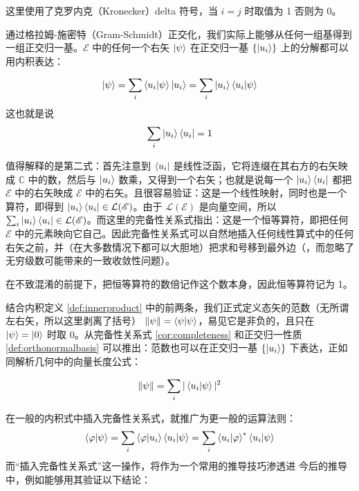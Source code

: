 \documentclass[cn,10pt,math=newtx,citestyle=gb7714-2015,bibstyle=gb7714-2015]{elegantbook}
\def\ms{\mathscr}
\def\mc{\mathcal}
\def\mr{\mathrm}
\def\C{\mathbb C}
\def\vphi{\varphi}
\begin{document}
这里使用了克罗内克（Kronecker）delta 符号，当 $i=j$ 时取值为 1 否则为 0。

通过格拉姆-施密特（Gram-Schmidt）正交化，我们实际上能够从任何一组基得到一组正交归一基。$\ms E$ 中的任何一个右矢 $\ket{\psi}$ 在正交归一基 $\{\ket{u_i}\}$ 上的分解都可以用内积表达：

\begin{corollary}[完备性关系式]\label{cor:completeness}
\begin{equation}
    \ket{\psi}=\sum_i\braket{u_i|\psi}\ket{u_i}=\sum_i\ket{u_i}\braket{u_i|\psi}
\end{equation}
这也就是说
\begin{equation}
    \sum_i\ket{u_i}\bra{u_i}=\mr 1
\end{equation}
\end{corollary}

\begin{remark}
值得解释的是第二式：首先注意到 $\bra{u_i}$ 是线性泛函，它将连缀在其右方的右矢映成 $\C$ 中的数，然后与 $\ket{u_i}$ 数乘，又得到一个右矢；也就是说每一个 $\ket{u_i}\bra{u_i}$ 都把 $\ms E$ 中的右矢映成 $\ms E$ 中的右矢。且很容易验证：这是一个线性映射，同时也是一个算符，即得到 $\ket{u_i}\bra{u_i}\in\mc L(\ms E)$。由于 $\mc L(\ms E)$ 是向量空间，所以 $\sum_i\ket{u_i}\bra{u_i}\in\mc L(\ms E)$。而这里的完备性关系式指出：这是一个恒等算符，即把任何 $\ms E$ 中的元素映向它自己。因此完备性关系式可以自然地插入任何线性算式中的任何右矢之前，并（在大多数情况下都可以大胆地）把求和号移到最外边（，而忽略了无穷级数可能带来的一致收敛性问题）。

在不致混淆的前提下，把恒等算符的数倍记作这个数本身，因此恒等算符记为 1。
\end{remark}

结合内积定义 \ref{def:innerproduct} 中的前两条，我们正式定义态矢的范数（无所谓左右矢，所以这里剥离了括号） $\|\psi\|=\braket{\psi|\psi}$，易见它是非负的，且只在 $\ket{\psi}=\ket{0}$ 时取 $0$。从完备性关系式 \ref{cor:completeness} 和正交归一性质 \ref{def:orthonormalbasis} 可以推出：范数也可以在正交归一基 $\{\ket{u_i}\}$ 下表达，正如同解析几何中的向量长度公式：

\begin{theorem}[勾股定理]\label{thm:Pythagorean}
\begin{equation*}
   \|\psi\|=\sum_i|\braket{u_i|\psi}|^2 
\end{equation*}
\end{theorem}

在一般的内积式中插入完备性关系式，就推广为更一般的运算法则：
\begin{equation}\label{eq:ipcommon}
   \braket{\vphi|\psi}=\sum_i\braket{\vphi|u_i}\braket{u_i|\psi}=\sum_i\braket{u_i|\vphi}^*\braket{u_i|\psi}
\end{equation}
而“插入完备性关系式”这一操作，将作为一个常用的推导技巧渗透进
今后的推导中，例如能够用其验证以下结论：
\end{document}
